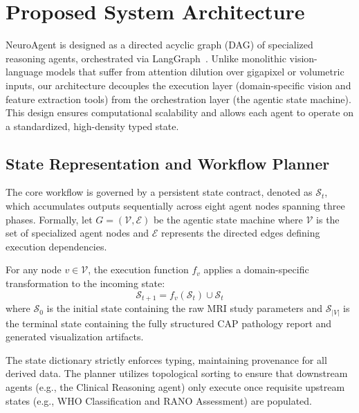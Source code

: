 \section{Proposed System Architecture}

NeuroAgent is designed as a directed acyclic graph (DAG) of specialized reasoning agents, orchestrated via LangGraph~\cite{langgraph2024}. Unlike monolithic vision-language models that suffer from attention dilution over gigapixel or volumetric inputs, our architecture decouples the execution layer (domain-specific vision and feature extraction tools) from the orchestration layer (the agentic state machine). This design ensures computational scalability and allows each agent to operate on a standardized, high-density typed state.

\subsection{State Representation and Workflow Planner}

The core workflow is governed by a persistent state contract, denoted as $\mathcal{S}_t$, which accumulates outputs sequentially across eight agent nodes spanning three phases. Formally, let $G = (\mathcal{V}, \mathcal{E})$ be the agentic state machine where $\mathcal{V}$ is the set of specialized agent nodes and $\mathcal{E}$ represents the directed edges defining execution dependencies. 

For any node $v \in \mathcal{V}$, the execution function $f_v$ applies a domain-specific transformation to the incoming state:
\begin{equation}
\mathcal{S}_{t+1} = f_v(\mathcal{S}_t) \cup \mathcal{S}_t
\end{equation}
where $\mathcal{S}_0$ is the initial state containing the raw MRI study parameters and $\mathcal{S}_{|V|}$ is the terminal state containing the fully structured CAP pathology report and generated visualization artifacts. 

The state dictionary strictly enforces typing, maintaining provenance for all derived data. The planner utilizes topological sorting to ensure that downstream agents (e.g., the Clinical Reasoning agent) only execute once requisite upstream states (e.g., WHO Classification and RANO Assessment) are populated.

